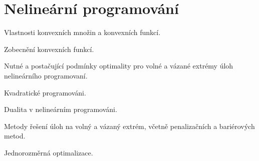 \newpage
\section{Nelineární programování}
\begin{pozadavky}
\begin{pitemize}
\item Vlastnosti konvexních množin a konvexních funkcí.
\item Zobecnění konvexních funkcí.
\item Nutné a postačující podmínky optimality pro volné a vázané extrémy úloh nelineárního programovaní.
\item Kvadratické programováni.
\item Dualita v nelineárním programováni.
\item Metody řešení úloh na volný a vázaný extrém, včetně penalizačních a bariérových metod.
\item Jednorozměrná optimalizace.
\end{pitemize}
\end{pozadavky}